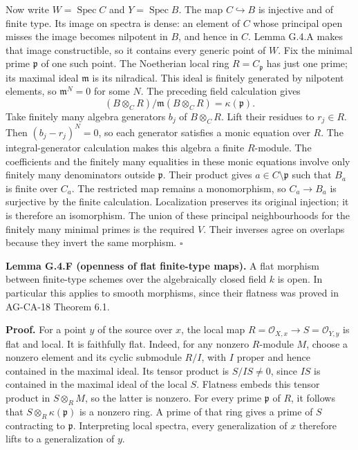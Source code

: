 \documentclass[11pt,a4paper,openany]{report}
\begin{document}
Now write \(W=\operatorname{Spec}C\) and \(Y=\operatorname{Spec}B\). The map \(C\hookrightarrow B\) is injective and of finite type. Its image on spectra is dense: an element of \(C\) whose principal open misses the image becomes nilpotent in \(B\), and hence in \(C\). Lemma G.4.A makes that image constructible, so it contains every generic point of \(W\). Fix the minimal prime \(\mathfrak p\) of one such point. The Noetherian local ring \(R=C_{\mathfrak p}\) has just one prime; its maximal ideal \(\mathfrak m\) is its nilradical. This ideal is finitely generated by nilpotent elements, so \(\mathfrak m^N=0\) for some \(N\). The preceding field calculation gives \[
 (B\otimes_C R)/\mathfrak m(B\otimes_C R)=\kappa(\mathfrak p).
\] Take finitely many algebra generators \(b_j\) of \(B\otimes_C R\). Lift their residues to \(r_j\in R\). Then \((b_j-r_j)^N=0\), so each generator satisfies a monic equation over \(R\). The integral-generator calculation makes this algebra a finite \(R\)-module. The coefficients and the finitely many equalities in these monic equations involve only finitely many denominators outside \(\mathfrak p\). Their product gives \(a\in C\setminus\mathfrak p\) such that \(B_a\) is finite over \(C_a\). The restricted map remains a monomorphism, so \(C_a\to B_a\) is surjective by the finite calculation. Localization preserves its original injection; it is therefore an isomorphism. The union of these principal neighbourhoods for the finitely many minimal primes is the required \(V\). Their inverses agree on overlaps because they invert the same morphism. \(\square\)

\textbf{Lemma G.4.F (openness of flat finite-type maps).} A flat morphism between finite-type schemes over the algebraically closed field \(k\) is open. In particular this applies to smooth morphisms, since their flatness was proved in AG-CA-18 Theorem 6.1.

\textbf{Proof.} For a point \(y\) of the source over \(x\), the local map \(R=\mathcal O_{X,x}\to S=\mathcal O_{Y,y}\) is flat and local. It is faithfully flat. Indeed, for any nonzero \(R\)-module \(M\), choose a nonzero element and its cyclic submodule \(R/I\), with \(I\) proper and hence contained in the maximal ideal. Its tensor product is \(S/IS\ne0\), since \(IS\) is contained in the maximal ideal of the local \(S\). Flatness embeds this tensor product in \(S\otimes_R M\), so the latter is nonzero. For every prime \(\mathfrak p\) of \(R\), it follows that \(S\otimes_R\kappa(\mathfrak p)\) is a nonzero ring. A prime of that ring gives a prime of \(S\) contracting to \(\mathfrak p\). Interpreting local spectra, every generalization of \(x\) therefore lifts to a generalization of \(y\).
\end{document}
